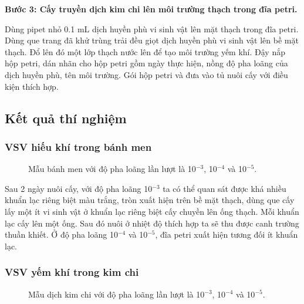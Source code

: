 \textbf{Bước 3: Cấy truyền dịch kim chi lên môi trường thạch trong đĩa petri.}

Dùng pipet nhỏ 0.1 mL dịch huyền phù vi sinh vật lên mặt thạch trong đĩa petri. Dùng que trang đã khử trùng trải đều giọt dịch huyền phù vi sinh vật lên bề mặt thạch. Đổ lên đó một lớp thạch nước lên để tạo môi trường yếm khí. Đậy nắp hộp petri, dán nhãn cho hộp petri gồm ngày thực hiện, nồng độ pha loãng của dịch huyền phù, tên môi trường. Gói hộp petri và đưa vào tủ nuôi cấy với điều kiện thích hợp.

\subsection{Kết quả thí nghiệm}

\subsubsection{VSV hiếu khí trong bánh men}

\begin{figure}[h]
      \centering
      \qquad
      \qquad
  \caption{Mẫu bánh men với độ pha loãng lần lượt là 10$^{-3}$, 10$^{-4}$ và 10$^{-5}$.}
\end{figure}

Sau 2 ngày nuôi cấy, với độ pha loãng 10$^{-3}$ ta có thể quan sát được khá nhiều khuẩn lạc riêng biệt màu trắng, tròn xuất hiện trên bề mặt thạch, dùng que cấy lấy một ít vi sinh vật ở khuẩn lạc riêng biệt cấy chuyền lên ống thạch. Mỗi khuẩn lạc cấy lên một ống. Sau đó nuôi ở nhiệt độ thích hợp ta sẽ thu được canh trường thuần khiết. Ở độ pha loãng 10$^{-4}$ và 10$^{-5}$, đĩa petri xuất hiện tương đối ít khuẩn lạc. 

\subsubsection{VSV yếm khí trong kim chi}

\begin{figure}[h]
      \centering
      \qquad
      \qquad
  \caption{Mẫu dịch kim chi với độ pha loãng lần lượt là 10$^{-3}$, 10$^{-4}$ và 10$^{-5}$.}
\end{figure}

